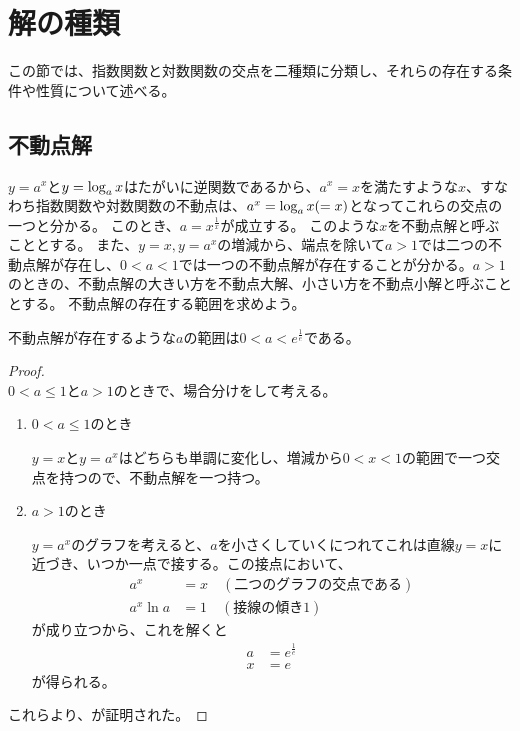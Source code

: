 \section{解の種類}
	この節では、指数関数と対数関数の交点を二種類に分類し、それらの存在する条件や性質について述べる。
	
\subsection{不動点解}
	$y = a^x$と$y = \log_{a} x$はたがいに逆関数であるから、$a^x = x$を満たすような$x$、すなわち指数関数や対数関数の不動点は、$a^x = \log_{a} x( = x)$となってこれらの交点の一つと分かる。
	このとき、$a = x^{\frac{1}{x}}$が成立する。
	このような$x$を不動点解と呼ぶこととする。
	また、$y = x,y = a^x$の増減から、端点を除いて$a > 1$では二つの不動点解が存在し、$0 < a < 1$では一つの不動点解が存在することが分かる。$a > 1$のときの、不動点解の大きい方を不動点大解、小さい方を不動点小解と呼ぶこととする。
	不動点解の存在する範囲を求めよう。
	\begin{theorem}
	\label{th:fixed_solutions}
		不動点解が存在するような$a$の範囲は$0 < a < e^\frac{1}{e}$である。
	\end{theorem}
	\begin{proof} \mbox{}\\
		$0 < a \leq 1$と$a > 1$のときで、場合分けをして考える。
		\begin{enumerate}
			\item $0 < a \leq 1$のとき
			
				$y = x$と$y = a^x$はどちらも単調に変化し、増減から$0 < x < 1$の範囲で一つ交点を持つので、不動点解を一つ持つ。
			\item $a > 1$のとき
			
				$y = a^x$のグラフを考えると、$a$を小さくしていくにつれてこれは直線$y = x$に近づき、いつか一点で接する。この接点において、
				\begin{align*}
					a^x &= x \quad (\text{二つのグラフの交点である}) \\
					a^x\ln{a} &= 1 \quad (\text{接線の傾き1})
				\end{align*}
				が成り立つから、これを解くと
				\begin{align*}
					a &= e^\frac{1}{e} \\
					x &= e 
				\end{align*}
				が得られる。
		\end{enumerate}
		これらより、が証明された。
	\end{proof}

